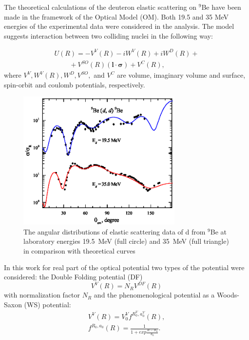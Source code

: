 \documentclass[10pt]{iopart}
\begin{document}
The theoretical calculations  of the deuteron  elastic scattering  on  $^9$Be have been made in the framework of the Optical Model (OM). Both 19.5 and 35 MeV  energies of the experimental data  were considered in the analysis.  The model suggests interaction between two colliding nuclei in the following way:

\begin{equation}\label{eqn:OP}
\begin{array}{l}
 U(R)=-V^{V}(R)-iW^{V}(R)+iW^D(R)+\\
~~~ ~~~~~~~+V^{SO}(R)( \mathbf{l} \cdot \mathbf{ \sigma } )+V^C(R),
\end{array}
 \end{equation}
where $V^{V}, W^{V}(R), W^D, V^{SO}, $ and $V^C$ are volume, imaginary volume and surface, spin-orbit and coulomb potentials, respectively. 

\begin{figure}[h]
\centering
\includegraphics[width=8.2cm]{2H9BE.eps}
\caption{ \label{2H9BE}  \footnotesize The angular distributions of elastic scattering data of d from $^9$Be at laboratory energies 19.5~MeV (full circle) and 35~MeV (full triangle) in comparison with theoretical curves }
\end{figure} 
 
 In this work for real part of the optical potential  two types of the potential  were considered: the Double Folding potential (DF)
\begin{equation}
V^V(R) = N_R V^{DF}(R) 
\end{equation}
with normalization factor $N_R$ and the phenomenological potential as a Woods-Saxon (WS) potential:
\begin{eqnarray}
V^V(R) =  V^V_0 f^{R^V_0, a^V_0}(R), \\
 f^{R_0,a_0}(R)=\frac{1}{1+exp{\frac{R-R_0}{a_0}}}.
\end{eqnarray}
\end{document}
